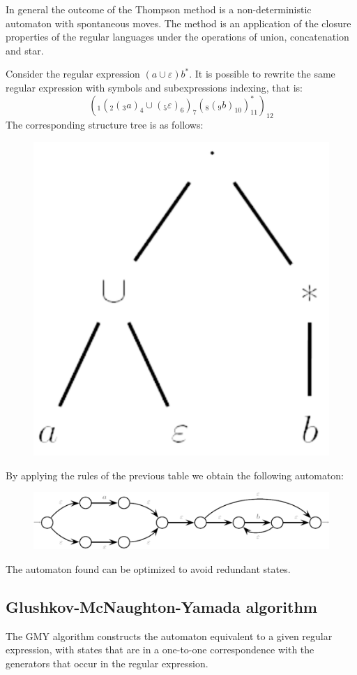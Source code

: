 In general the outcome of the Thompson method is a non-deterministic automaton with spontaneous moves. 
The method is an application of the closure properties of the regular languages under the operations of union, concatenation and star.
\begin{example}
    Consider the regular expression $(a \cup \varepsilon)b^{*}$. 
    It is possible to rewrite the same regular expression with symbols and subexpressions indexing, that is: 
    \[\left(_1\left(_2\left(_3a\right)_4 \cup \left(_5\varepsilon\right)_6\right)_7\left(_8\left(_9b\right)_{10}\right)_{11}^{*}\right)_{12}\]
    The corresponding structure tree is as follows: 
    \begin{figure}[H]
        \centering
        \includegraphics[width=0.15\linewidth]{images/st.png}
    \end{figure}
    By applying the rules of the previous table we obtain the following automaton: 
    \begin{figure}[H]
        \centering
        \includegraphics[width=0.75\linewidth]{images/at.png}
    \end{figure}
    The automaton found can be optimized to avoid redundant states. 
\end{example}

\subsection*{Glushkov-McNaughton-Yamada algorithm}
The GMY algorithm constructs the automaton equivalent to a given regular expression, with states that are in a one-to-one correspondence with the generators that occur in the regular expression. 


